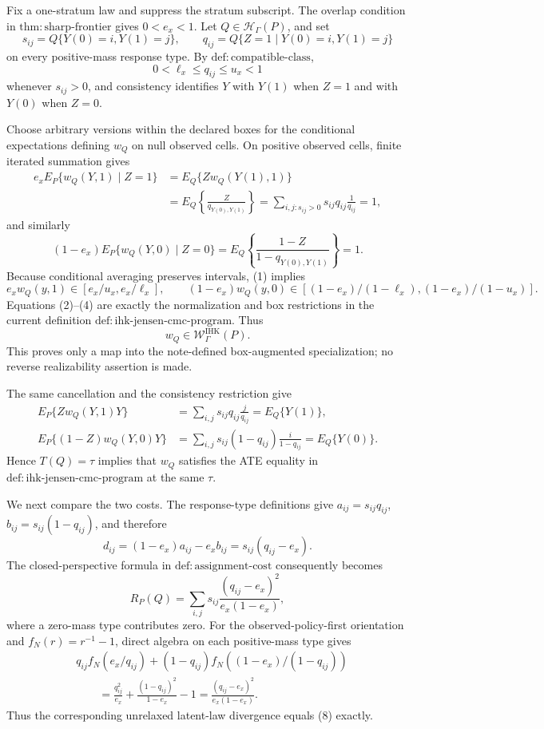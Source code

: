 Fix a one-stratum law and suppress the stratum subscript.  The overlap condition in \(\mathrm{thm{:}sharp\mbox{-}frontier}\) gives \(0<e_x<1\).  Let \(Q\in\mathcal H_\Gamma(P)\), and set
\[
s_{ij}=Q\{Y(0)=i,Y(1)=j\},
\qquad
q_{ij}=Q\{Z=1\mid Y(0)=i,Y(1)=j\}
\]
on every positive-mass response type.  By \(\mathrm{def{:}compatible\mbox{-}class}\),
\[
0<\ell_x\leq q_{ij}\leq u_x<1
\tag{1}
\]
whenever \(s_{ij}>0\), and consistency identifies \(Y\) with \(Y(1)\) when \(Z=1\) and with \(Y(0)\) when \(Z=0\).

Choose arbitrary versions within the declared boxes for the conditional expectations defining \(w_Q\) on null observed cells.  On positive observed cells, finite iterated summation gives
\[
\begin{aligned}
e_xE_P\{w_Q(Y,1)\mid Z=1\}
&=E_Q\{Z w_Q(Y(1),1)\}\\
&=E_Q\!\left\{\frac{Z}{q_{Y(0),Y(1)}}\right\}
=\sum_{i,j:s_{ij}>0}s_{ij}q_{ij}\frac{1}{q_{ij}}=1,
\end{aligned}
\tag{2}
\]
and similarly
\[
(1-e_x)E_P\{w_Q(Y,0)\mid Z=0\}
=E_Q\!\left\{\frac{1-Z}{1-q_{Y(0),Y(1)}}\right\}=1.
\tag{3}
\]
Because conditional averaging preserves intervals, (1) implies
\[
e_xw_Q(y,1)\in[e_x/u_x,e_x/\ell_x],
\qquad
(1-e_x)w_Q(y,0)
\in[(1-e_x)/(1-\ell_x),(1-e_x)/(1-u_x)].
\tag{4}
\]
Equations (2)--(4) are exactly the normalization and box restrictions in the current definition \(\mathrm{def{:}ihk\mbox{-}jensen\mbox{-}cmc\mbox{-}program}\).  Thus
\[
w_Q\in\mathcal W^{\mathrm{IHK}}_\Gamma(P).
\tag{5}
\]
This proves only a map into the note-defined box-augmented specialization; no reverse realizability assertion is made.

The same cancellation and the consistency restriction give
\[
\begin{aligned}
E_P\{Zw_Q(Y,1)Y\}
&=\sum_{i,j}s_{ij}q_{ij}\frac{j}{q_{ij}}
=E_Q\{Y(1)\},\\
E_P\{(1-Z)w_Q(Y,0)Y\}
&=\sum_{i,j}s_{ij}(1-q_{ij})\frac{i}{1-q_{ij}}
=E_Q\{Y(0)\}.
\end{aligned}
\tag{6}
\]
Hence \(T(Q)=\tau\) implies that \(w_Q\) satisfies the ATE equality in \(\mathrm{def{:}ihk\mbox{-}jensen\mbox{-}cmc\mbox{-}program}\) at the same \(\tau\).

We next compare the two costs.  The response-type definitions give \(a_{ij}=s_{ij}q_{ij}\), \(b_{ij}=s_{ij}(1-q_{ij})\), and therefore
\[
d_{ij}=(1-e_x)a_{ij}-e_xb_{ij}=s_{ij}(q_{ij}-e_x).
\tag{7}
\]
The closed-perspective formula in \(\mathrm{def{:}assignment\mbox{-}cost}\) consequently becomes
\[
R_P(Q)=\sum_{i,j}s_{ij}\frac{(q_{ij}-e_x)^2}{e_x(1-e_x)},
\tag{8}
\]
where a zero-mass type contributes zero.  For the observed-policy-first orientation and \(f_N(r)=r^{-1}-1\), direct algebra on each positive-mass type gives
\[
\begin{aligned}
&q_{ij}f_N(e_x/q_{ij})
+(1-q_{ij})f_N((1-e_x)/(1-q_{ij}))\\
&\qquad=\frac{q_{ij}^2}{e_x}
+\frac{(1-q_{ij})^2}{1-e_x}-1
=\frac{(q_{ij}-e_x)^2}{e_x(1-e_x)}.
\end{aligned}
\tag{9}
\]
Thus the corresponding unrelaxed latent-law divergence equals (8) exactly.

